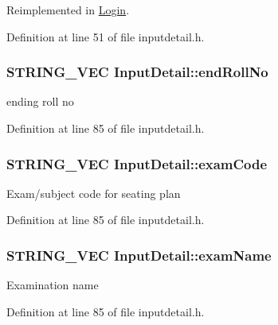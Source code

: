 \-Reimplemented in \hyperlink{classLogin_abea56d6d6403f1e627294f222dd77310}{\-Login}.



\-Definition at line 51 of file inputdetail.\-h.

\hypertarget{classInputDetail_abc3249eab8fbf895620deff0a9349333}{
\subsubsection[{end\-Roll\-No}]{\setlength{\rightskip}{0pt plus 5cm}\-S\-T\-R\-I\-N\-G\-\_\-\-V\-E\-C {\bf \-Input\-Detail\-::end\-Roll\-No}}}\label{classInputDetail_abc3249eab8fbf895620deff0a9349333}
ending roll no 

\-Definition at line 85 of file inputdetail.\-h.

\hypertarget{classInputDetail_ac48c0170ce354d3cd188ddc2e83e2c67}{
\subsubsection[{exam\-Code}]{\setlength{\rightskip}{0pt plus 5cm}\-S\-T\-R\-I\-N\-G\-\_\-\-V\-E\-C {\bf \-Input\-Detail\-::exam\-Code}}}\label{classInputDetail_ac48c0170ce354d3cd188ddc2e83e2c67}
\-Exam/subject code for seating plan 

\-Definition at line 85 of file inputdetail.\-h.

\hypertarget{classInputDetail_a7b4e4a2a26f23da75d9928601a88a1d9}{
\subsubsection[{exam\-Name}]{\setlength{\rightskip}{0pt plus 5cm}\-S\-T\-R\-I\-N\-G\-\_\-\-V\-E\-C {\bf \-Input\-Detail\-::exam\-Name}}}\label{classInputDetail_a7b4e4a2a26f23da75d9928601a88a1d9}
\-Examination name 

\-Definition at line 85 of file inputdetail.\-h.

